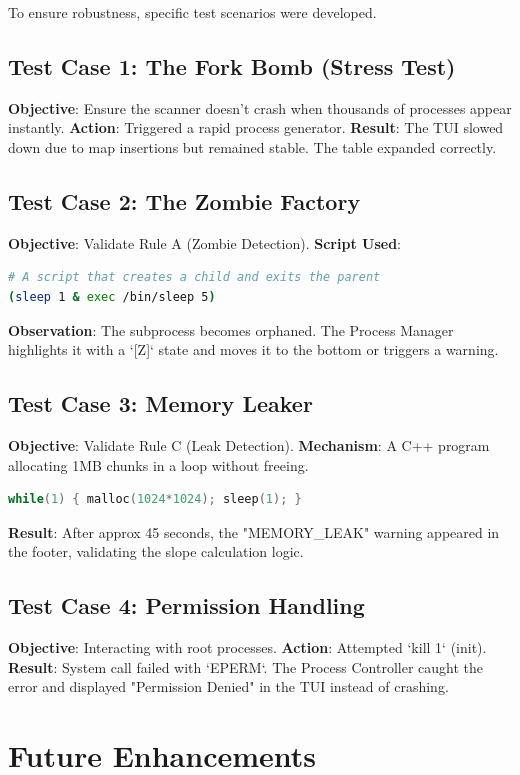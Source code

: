 \documentclass[a4paper,12pt]{article}
\begin{document}
To ensure robustness, specific test scenarios were developed.

\subsection{Test Case 1: The Fork Bomb (Stress Test)}
\textbf{Objective}: Ensure the scanner doesn't crash when thousands of processes appear instantly.
\textbf{Action}: Triggered a rapid process generator.
\textbf{Result}: The TUI slowed down due to map insertions but remained stable. The table expanded correctly.

\subsection{Test Case 2: The Zombie Factory}
\textbf{Objective}: Validate Rule A (Zombie Detection).
\textbf{Script Used}:
\begin{lstlisting}[language=bash]
# A script that creates a child and exits the parent
(sleep 1 & exec /bin/sleep 5)
\end{lstlisting}
\textbf{Observation}: The subprocess becomes orphaned. The Process Manager highlights it with a `[Z]` state and moves it to the bottom or triggers a warning.

\subsection{Test Case 3: Memory Leaker}
\textbf{Objective}: Validate Rule C (Leak Detection).
\textbf{Mechanism}: A C++ program allocating 1MB chunks in a loop without freeing.
\begin{lstlisting}[language=C++]
while(1) { malloc(1024*1024); sleep(1); }
\end{lstlisting}
\textbf{Result}: After approx 45 seconds, the "MEMORY_LEAK" warning appeared in the footer, validating the slope calculation logic.

\subsection{Test Case 4: Permission Handling}
\textbf{Objective}: Interacting with root processes.
\textbf{Action}: Attempted `kill 1` (init).
\textbf{Result}: System call failed with `EPERM`. The Process Controller caught the error and displayed "Permission Denied" in the TUI instead of crashing.

\section{Future Enhancements}
\end{document}
